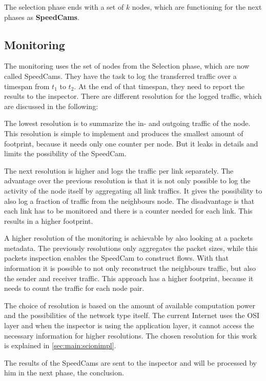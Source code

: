 \documentclass[thesis.tex]{subfiles}
\begin{document}
The selection phase ends with a set of $k$ nodes, which are functioning for the next phases as \textbf{SpeedCams}.

\subsection{Monitoring}
The monitoring uses the set of nodes from the Selection phase, which are now called SpeedCams. They have the task to log the transferred traffic over a timespan from $t_1$ to $t_2$. At the end of that timespan, they need to report the results to the inspector. There are different resolution for the logged traffic, which are discussed in the following:

The lowest resolution is to summarize the in- and outgoing traffic of the node. This resolution is simple to implement and produces the smallest amount of footprint, because it needs only one counter per node. But it leaks in details and limits the possibility of the SpeedCam.

The next resolution is higher and logs the traffic per link separately. The advantage over the previous resolution is that it is not only possible to log the activity of the node itself by aggregating all link traffics. It gives the possibility to also log a fraction of traffic from the neighbours node. The disadvantage is that each link has to be monitored and there is a counter needed for each link. This results in a higher footprint.

A higher resolution of the monitoring is achievable by also looking at a packets metadata. The previously resolutions only aggregates the packet sizes, while this packets inspection enables the SpeedCam to construct flows. With that information it is possible to not only reconstruct the neighbours traffic, but also the sender and receiver traffic. This approach has a higher footprint, because it needs to count the traffic for each node pair.

The choice of resolution is based on the amount of available computation power and the possibilities of the network type itself. The current Internet uses the OSI layer  and when the inspector is using the application layer, it cannot access the necessary information for higher resolutions. The chosen resolution for this work is explained in \autoref{sec:main:scionimpl}.

The results of the SpeedCams are sent to the inspector and will be processed by him in the next phase, the conclusion.
\end{document}
